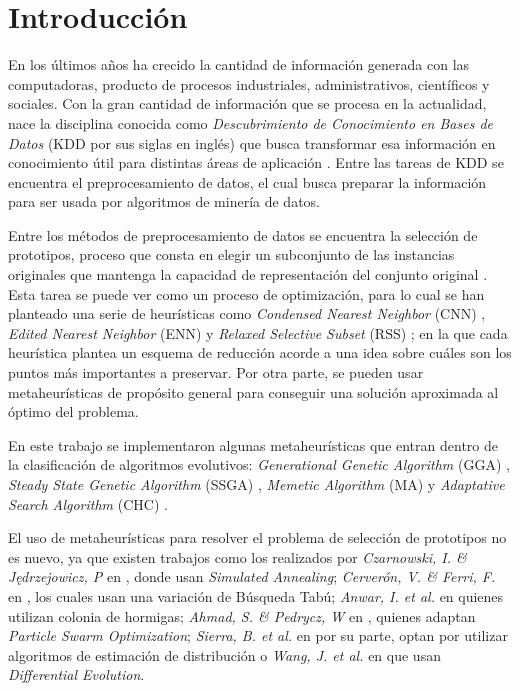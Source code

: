 \chapter*{Introducción}
\label{intro}

En los últimos años ha crecido la cantidad de información generada con las computadoras, producto de procesos industriales, administrativos, científicos y sociales. Con la gran cantidad de información que se procesa en la actualidad, nace la disciplina conocida como \emph{Descubrimiento de Conocimiento en Bases de Datos} (KDD por sus siglas en inglés) que busca transformar esa información en conocimiento útil para distintas áreas de aplicación \cite{han2011data}. Entre las tareas de KDD se encuentra el preprocesamiento de datos, el cual busca preparar la información para ser usada por algoritmos de minería de datos. 

Entre los métodos de preprocesamiento de datos se encuentra la selección de prototipos, proceso que consta en elegir un subconjunto de las instancias originales que mantenga la capacidad de representación del conjunto original \cite{garcia2016data}. Esta tarea se puede ver como un proceso de optimización, para lo cual se han planteado una serie de heurísticas como \emph{Condensed Nearest Neighbor} (CNN) \cite{hart1968condensed}, \emph{Edited Nearest Neighbor} (ENN) \cite{wilson1972asymptotic} y \emph{Relaxed Selective Subset} (RSS) \cite{floresnearest}; en la que cada heurística plantea un esquema de reducción acorde a una idea sobre cuáles son los puntos más importantes a preservar. Por otra parte, se pueden usar metaheurísticas de propósito general para conseguir una solución aproximada al óptimo del problema. 

En este trabajo se implementaron algunas metaheurísticas que entran dentro de la clasificación de algoritmos evolutivos: \emph{Generational Genetic Algorithm} (GGA) \cite{holland1975adaptation}, \emph{Steady State Genetic Algorithm} (SSGA) \cite{talbi2009metaheuristics}, \emph{Memetic Algorithm} (MA) \cite{neri2012memetic} y \emph{Adaptative Search Algorithm} (CHC) \cite{eshelman1991chc}.

El uso de metaheurísticas para resolver el problema de selección de prototipos no es nuevo, ya que existen trabajos como los realizados por \emph{Czarnowski, I. \& J{\k{e}}drzejowicz, P} en \cite{czarnowski2011application}, donde usan \emph{Simulated Annealing}; \emph{Cerverón, V. \& Ferri, F.} en \cite{cerveron2001another}, los cuales usan una variación de Búsqueda Tabú; \emph{Anwar, I. et al.} en \cite{anwar2015instance,anwar2015adr} quienes utilizan colonia de hormigas; \emph{Ahmad, S. \& Pedrycz, W} en \cite{ahmad2011feature}, quienes adaptan \emph{Particle Swarm Optimization}; \emph{Sierra, B. et al.} en \cite{sierra2001prototype} por su parte, optan por utilizar algoritmos de estimación de distribución o \emph{Wang, J. et al.} en \cite{wang2016differential} que usan \emph{Differential Evolution}. 

